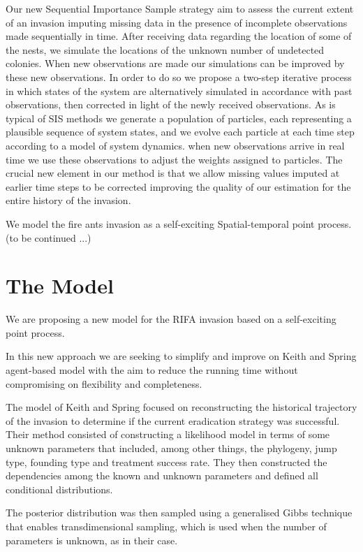 \documentclass[11pt,a4paper]{article}
\begin{document}
{Our new Sequential Importance Sample strategy aim to assess the current extent of an invasion imputing missing data in the presence of incomplete observations made sequentially in time. After receiving data regarding the location of some of the nests, we simulate the locations of the unknown number of undetected colonies. When new observations are made our simulations can be improved by these new observations. In order to do so we propose a two-step iterative process in which states of the system are alternatively simulated in accordance with past observations, then corrected in light of the newly received observations. As is typical of SIS methods we generate a population of particles, each representing a plausible sequence of system states, and we evolve each particle at each time step according to a model of system dynamics. when new observations arrive in real time we use these observations to adjust the weights assigned to particles. The crucial new element in our method is that we allow missing values imputed at earlier time steps to be corrected improving the quality of our estimation for the entire history of the invasion.

We model the fire ants invasion as a self-exciting Spatial-temporal point process.  (to be continued ...)}


\section{The Model}\label{section:model}

We are proposing a new model for the RIFA invasion based on a self-exciting point process.

In this new approach we are seeking to simplify and improve on Keith and Spring agent-based model \cite{Keith} with the aim to reduce the running time without compromising on flexibility and completeness.

The model of Keith and Spring focused on reconstructing the historical trajectory of the invasion to determine if the current eradication strategy was successful. Their method consisted of constructing a likelihood model in terms of some unknown parameters that included, among other things, the phylogeny, jump type, founding type and treatment success rate. They then constructed the dependencies among the known and unknown parameters and defined all conditional distributions.

The posterior distribution was then sampled using a generalised Gibbs technique that enables transdimensional sampling, which is used when the number of parameters is unknown, as in their case.
\end{document}
